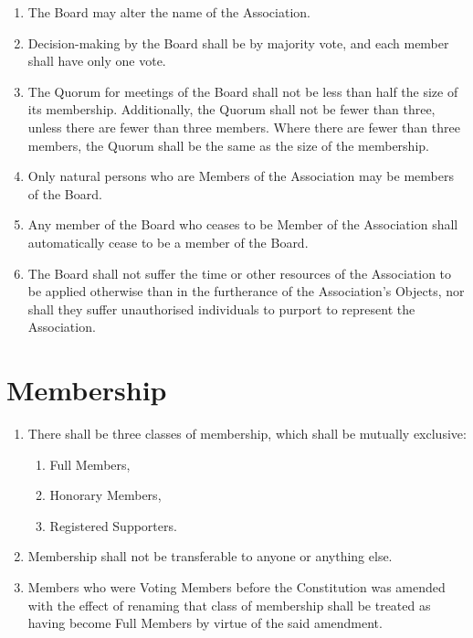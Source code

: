 \documentclass[10pt]{mk-articles-of-association}
\newcommand{\mysection}[1]{
  \end{enumerate}
  \section*{#1}
  \begin{enumerate}[resume]
}
\newcommand{\EC}[0]{Board}
\newcommand{\Exec}[0]{\EC{} }
\begin{document}
\begin{enumerate}
\begin{enumerate}
      \item co-opting additional Full Members as members of the \EC{}.

    \end{enumerate}

  \item The \Exec may alter the name of the Association.

  \item Decision-making by the \Exec shall be by majority vote, and each
    member shall have only one vote.\label{boardvote}

  \item The Quorum for meetings of the \Exec shall not be less than
    half the size of its membership. Additionally, the Quorum shall
    not be fewer than three, unless there are fewer than three
    members. Where there are fewer than three members, the Quorum shall
    be the same as the size of the membership.

  \item Only natural persons who are Members of the Association
    may be members of the \EC{}.

  \item Any member of the \Exec who ceases to be Member of the Association
    shall automatically cease to be a member of the \EC{}.

  \item The \Exec shall not suffer the time or other resources of
    the Association to be applied otherwise than in the furtherance of
    the Association's Objects, nor shall they suffer unauthorised individuals
    to purport to represent the Association.

\mysection{Membership}

  \item There shall be three classes of membership, which shall be mutually
    exclusive:
    \begin{enumerate}
      \item Full Members,
      \item Honorary Members, \ITand
      \item Registered Supporters.
    \end{enumerate}

  \item Membership shall not be transferable to anyone or anything else.

  \item Members who were Voting Members before the Constitution was
    amended with the effect of renaming that class of membership shall
    be treated as having become Full Members by virtue of the said
    amendment.


\end{enumerate}
\end{document}
